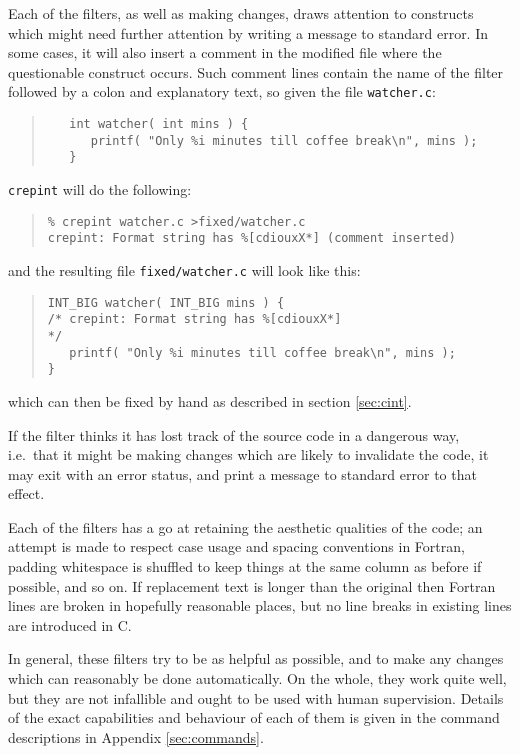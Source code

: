 \documentclass[twoside,11pt]{article}
\newcommand{\htmlref}[2]{#1}
\renewcommand{\_}{\texttt{\symbol{95}}}
\newcommand{\xroutine}[1]{\htmlref{{\tt #1}}{#1}}
\newcommand{\file}[1]{{\tt #1}}
\newenvironment{squote}{\begin{quote}\begin{small}}{\end{small}\end{quote}}
\begin{document}
Each of the filters, as well as making changes,
draws attention to constructs which might need
further attention by writing a message to standard error.
In some cases, it will also insert a comment in the modified file where
the questionable construct occurs.
Such comment lines contain the name of the filter followed by a colon
and explanatory text, so given the file \file{watcher.c}:
\begin{squote}
\begin{verbatim}
   int watcher( int mins ) {
      printf( "Only %i minutes till coffee break\n", mins );
   }
\end{verbatim}
\end{squote}
\xroutine{crepint} will do the following:
\begin{squote}
\begin{verbatim}
% crepint watcher.c >fixed/watcher.c
crepint: Format string has %[cdiouxX*] (comment inserted)
\end{verbatim}
\end{squote}
and the resulting file \file{fixed/watcher.c} will look like this:
\begin{squote}
\begin{verbatim}
INT_BIG watcher( INT_BIG mins ) {
/* crepint: Format string has %[cdiouxX*]                                */
   printf( "Only %i minutes till coffee break\n", mins );
}
\end{verbatim}
\end{squote}
which can then be fixed by hand as described in
section \ref{sec:cint}.

If the filter thinks it has lost track of the source code in a dangerous
way, i.e.\ that it might be making changes which are likely to invalidate
the code, it may exit with an error status, and print a message to standard
error to that effect.

Each of the filters has a go at retaining the aesthetic
qualities of the code; an attempt is made to respect
case usage and spacing conventions in Fortran,
padding whitespace is shuffled to keep things at the same column as
before if possible, and so on.
If replacement text is longer than the original
then Fortran lines are broken in hopefully reasonable places,
but no line breaks in existing lines are introduced in C.

In general, these filters try to be as helpful as possible,
and to make any changes which can reasonably be done automatically.
On the whole, they work quite well, but they are not infallible
and ought to be used with human supervision.
Details of the exact capabilities and behaviour of each of them is
given in the command descriptions in Appendix \ref{sec:commands}.
\end{document}
